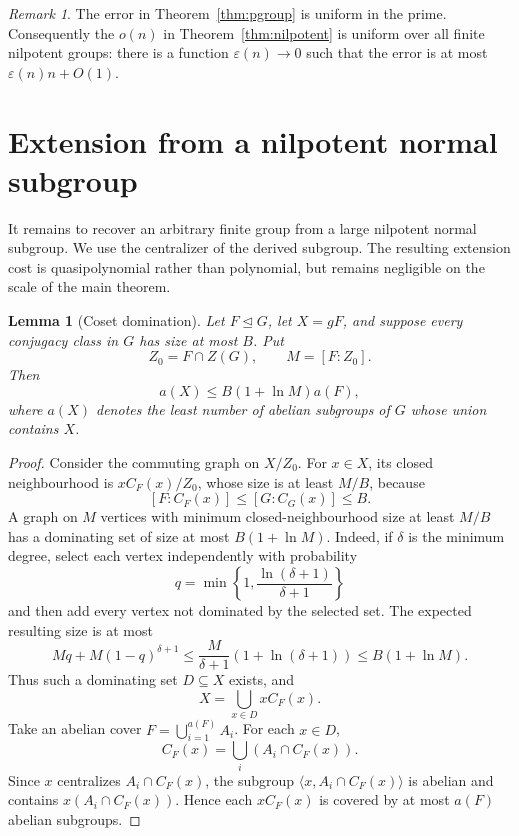 \documentclass[11pt]{article}
\newtheorem{lemma}[theorem]{Lemma}
\theoremstyle{definition}
\theoremstyle{remark}
\newtheorem{remark}[theorem]{Remark}
\begin{document}
\begin{remark}\label{rem:nilpotent-uniform}
The error in Theorem~\ref{thm:pgroup} is uniform in the prime. Consequently the $o(n)$ in Theorem~\ref{thm:nilpotent} is uniform over all finite nilpotent groups: there is a function $\varepsilon(n)\to0$ such that the error is at most $\varepsilon(n)n+O(1)$.
\end{remark}

\section{Extension from a nilpotent normal subgroup}

It remains to recover an arbitrary finite group from a large nilpotent normal subgroup. We use the centralizer of the derived subgroup. The resulting extension cost is quasipolynomial rather than polynomial, but remains negligible on the scale of the main theorem.

\begin{lemma}[Coset domination]\label{lem:coset-domination}
Let $F\trianglelefteq G$, let $X=gF$, and suppose every conjugacy class in $G$ has size at most $B$. Put
\[
Z_0=F\cap Z(G),\qquad M=[F:Z_0].
\]
Then
\[
a(X)\le B(1+\ln M)a(F),
\]
where $a(X)$ denotes the least number of abelian subgroups of $G$ whose union contains $X$.
\end{lemma}

\begin{proof}
Consider the commuting graph on $X/Z_0$. For $x\in X$, its closed neighbourhood is $xC_F(x)/Z_0$, whose size is at least $M/B$, because
\[
[F:C_F(x)]\le[G:C_G(x)]\le B.
\]
A graph on $M$ vertices with minimum closed-neighbourhood size at least $M/B$ has a dominating set of size at most $B(1+\ln M)$. Indeed, if $\delta$ is the minimum degree, select each vertex independently with probability
\[
q=\min\left\{1,\frac{\ln(\delta+1)}{\delta+1}\right\}
\]
and then add every vertex not dominated by the selected set. The expected resulting size is at most
\[
Mq+M(1-q)^{\delta+1}\le\frac{M}{\delta+1}(1+\ln(\delta+1))\le B(1+\ln M).
\]
Thus such a dominating set $D\subseteq X$ exists, and
\[
X=\bigcup_{x\in D}xC_F(x).
\]
Take an abelian cover $F=\bigcup_{i=1}^{a(F)}A_i$. For each $x\in D$,
\[
C_F(x)=\bigcup_i(A_i\cap C_F(x)).
\]
Since $x$ centralizes $A_i\cap C_F(x)$, the subgroup $\langle x,A_i\cap C_F(x)\rangle$ is abelian and contains $x(A_i\cap C_F(x))$. Hence each $xC_F(x)$ is covered by at most $a(F)$ abelian subgroups.
\end{proof}
\end{document}
